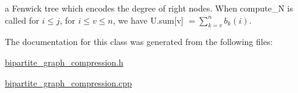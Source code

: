 a Fenwick tree which encodes the degree of right nodes. When compute\+\_\+N is called for $i \leq j$, for $i \leq v \leq n$, we have U.\+sum\mbox{[}v\mbox{]} $= \sum_{k = v}^n b_k(i)$. 



The documentation for this class was generated from the following files\+:\begin{DoxyCompactItemize}
\item 
\hyperlink{bipartite__graph__compression_8h}{bipartite\+\_\+graph\+\_\+compression.\+h}\item 
\hyperlink{bipartite__graph__compression_8cpp}{bipartite\+\_\+graph\+\_\+compression.\+cpp}\end{DoxyCompactItemize}
